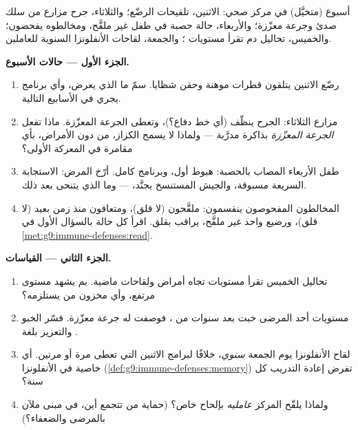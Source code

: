 \begin{problem}\label{pb:g9:immune-defenses:1}
أسبوع (متخيَّل) في مركز صحي: الاثنين، تلقيحات الرضّع؛
والثلاثاء، جرح مزارع من سلك صدئ وجرعة معزّزة؛
والأربعاء، حالة حصبة في طفل غير ملقَّح، ومخالطوه يفحصون؛
والخميس، تحاليل دم تقرأ مستويات ؛
والجمعة، لقاحات الأنفلونزا السنوية للعاملين.

\medskip\noindent\textbf{الجزء الأول --- حالات الأسبوع.}
\begin{enumerate}
  \item رضّع الاثنين يتلقون قطرات  موهنة وحقن
        شظايا. سمّ ما الذي يعرض، وأي برنامج يجري في
        الأسابيع التالية.
  \item مزارع الثلاثاء: الجرح ينظّف (أي خط دفاع؟)، وتعطى
        الجرعة المعزّزة. ماذا تفعل \emph{الجرعة المعزّزة}
        بذاكرة مدرَّبة --- ولماذا لا يسمح الكزاز، من دون
        الأمراض، بأي مقامرة في المعركة الأولى؟
  \item طفل الأربعاء المصاب بالحصبة: هبوط أول، وبرنامج
        كامل. أرّخ المرض: الاستجابة السريعة مسبوقة،
        والجيش المستنسخ يجنَّد،  --- وما الذي
        يتنحى بعد ذلك.
  \item المخالطون المفحوصون ينقسمون: ملقَّحون (لا قلق)،
        ومتعافون منذ زمن بعيد (لا قلق)، ورضيع واحد غير
        ملقَّح، يراقب بقلق. اقرأ كل حالة بالسؤال الأول في
        \cref{met:g9:immune-defenses:read}.
\end{enumerate}

\medskip\noindent\textbf{الجزء الثاني --- القياسات.}
\begin{enumerate}[resume]
  \item تحاليل الخميس تقرأ مستويات  تجاه
        أمراض ولقاحات ماضية. بم يشهد مستوى مرتفع، وأي
        مخزون من  يستلزمه؟
  \item مستويات أحد المرضى خبت بعد سنوات من ،
        فوصفت له جرعة معزّزة. فسّر الخبو والتعزيز بلغة
        .
  \item لقاح الأنفلونزا يوم الجمعة \emph{سنوي}، خلافًا
        لبرامج الاثنين التي تعطى مرة أو مرتين. أي خاصية
        في  الأنفلونزا
        (\cref{def:g9:immune-defenses:memory}) تفرض
        إعادة التدريب كل سنة؟
  \item ولماذا يلقّح المركز \emph{عامليه} بإلحاح خاص؟
        (حماية من تتجمع أين، في مبنى ملآن بالمرضى
        والضعفاء؟)
\end{enumerate}


\end{problem}
